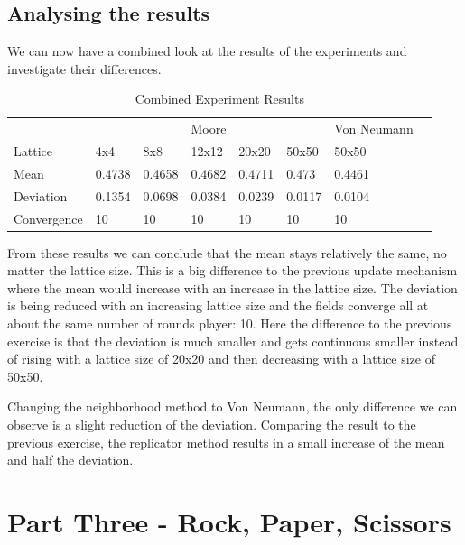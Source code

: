 \documentclass[a4paper, 11pt]{article}
\begin{document}
\newpage
\subsection{Analysing the results}

We can now have a combined look at the results of the experiments and investigate their differences.



\begin{table}[]
\centering
\caption{Combined Experiment Results}
\begin{tabular}{l|l|l|l|l|l|l|l}
            & \multicolumn{5}{c|}{Moore}                 & Von Neumann &  \\ \cline{1-7}
Lattice     & 4x4    & 8x8    & 12x12  & 20x20  & 50x50  & 50x50       &  \\ \cline{1-7}
Mean        & 0.4738 & 0.4658 & 0.4682 & 0.4711 & 0.473  & 0.4461      &  \\ \cline{1-7}
Deviation   & 0.1354 & 0.0698 & 0.0384 & 0.0239 & 0.0117 & 0.0104      &  \\ \cline{1-7}
Convergence & 10     & 10     & 10     & 10     & 10     & 10          &  \\ \cline{1-7}
\end{tabular}
\end{table}


From these results we can conclude that the mean stays relatively the same, no matter the lattice size. This is a big difference to the previous update mechanism where the mean would increase with an increase in the lattice size. The deviation is being reduced with an increasing lattice size and the fields converge all at about the same number of rounds player: 10. Here the difference to the previous exercise is that the deviation is much smaller and gets continuous smaller instead of rising with a lattice size of 20x20 and then decreasing with a lattice size of 50x50.

Changing the neighborhood method to Von Neumann, the only difference we can observe is a slight reduction of the deviation. Comparing the result to the previous exercise, the replicator method results in a small increase of the mean and half the deviation.

\hrulefill


\section{Part Three - Rock, Paper, Scissors}
\end{document}
